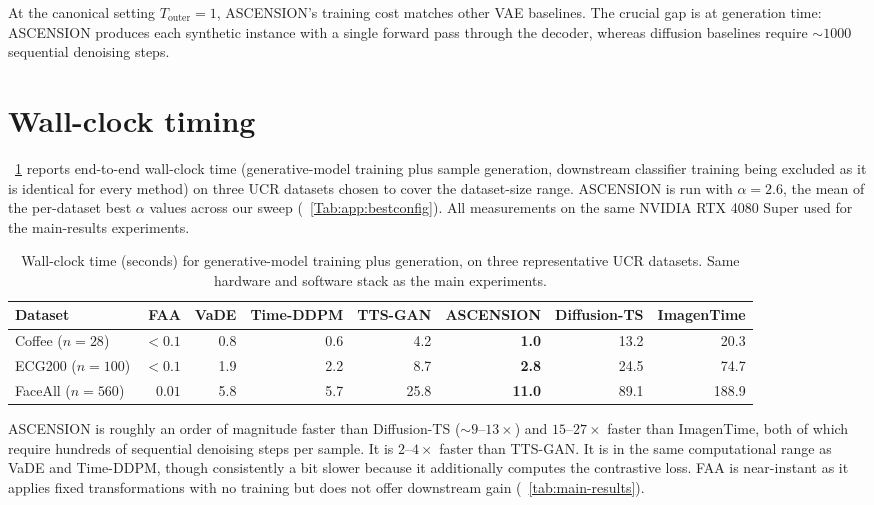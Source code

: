 At the canonical setting $T_{\text{outer}} = 1$, ASCENSION's
training cost matches other VAE baselines. The crucial gap is at
generation time: ASCENSION produces each synthetic instance with
a single forward pass through the decoder, whereas diffusion
baselines require $\sim 1000$ sequential denoising steps.

\section{Wall-clock timing}
\label{sec:complexity:wallclock}

\tablename~\ref{tab:wallclock} reports end-to-end wall-clock time
(generative-model training plus sample generation, downstream
classifier training being excluded as it is identical for every
method) on three UCR datasets chosen to cover the dataset-size
range. ASCENSION is run with $\alpha = 2.6$, the mean of the
per-dataset best $\alpha$ values across our sweep
(\tablename~\ref{Tab:app:bestconfig}).
All measurements on the same NVIDIA RTX 4080 Super used
for the main-results experiments.

\begin{table}[!htb]
\centering
\small
\caption{Wall-clock time (seconds) for generative-model training
plus generation, on three representative UCR datasets. Same
hardware and software stack as the main experiments.}
\label{tab:wallclock}
\begin{tabular}{@{}lrrrrrrr@{}}
\toprule
\textbf{Dataset} & FAA & VaDE & Time-DDPM & TTS-GAN &
\textbf{ASCENSION} & Diffusion-TS & ImagenTime \\
\midrule
Coffee  ($n\!=\!28$)   & $<\!0.1$ & 0.8 & 0.6 & 4.2  & \textbf{1.0}  & 13.2 & 20.3 \\
ECG200  ($n\!=\!100$)  & $<\!0.1$ & 1.9 & 2.2 & 8.7  & \textbf{2.8}  & 24.5 & 74.7 \\
FaceAll ($n\!=\!560$)  & $0.01$   & 5.8 & 5.7 & 25.8 & \textbf{11.0} & 89.1 & 188.9 \\
\bottomrule
\end{tabular}
\end{table}

ASCENSION is roughly an order of magnitude faster than
Diffusion-TS ($\sim 9$--$13\times$) and $15$--$27\times$ faster
than ImagenTime, both of which require hundreds of sequential
denoising steps per sample. It is $2$--$4\times$ faster than
TTS-GAN. It is in the same computational range as VaDE and
Time-DDPM, though consistently a bit slower because it
additionally computes the contrastive loss. FAA is near-instant
as it applies fixed transformations with no training but does
not offer downstream gain
(\tablename~\ref{tab:main-results}).



